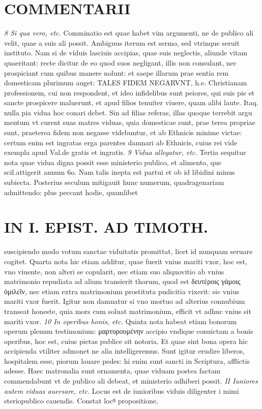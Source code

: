 \documentclass{article}
\begin{document}
\begin{pages}
\section*{COMMENTARII }
\marginpar{[ p.126 ]}
\textit{8 Si qua vero, etc. }\pstart Comminatio est quae habet vim argumenti, ne de publico ali velit, quae a suis ali possit. Ambiguus iterum est sermo, sed vtrinque seruit instituto. Nam si de viduis lasciuis accipias, quae suis neglectis, aliunde vitam quaeritant: recte dicitur de eo quod suos negligant, illis non consulant, nec prospiciant cum quibus  manere nolunt: et saepe illarum prae sentia rem domesticam plurimum auget: TALES FIDEM NEGARVNT, h.e. Christianam professionem, cui non respondent, et ideo infidelibus sunt peiores, qui suis pie et sancte prospicere maluerunt, et apud filios tenuiter viuere, quam alibi laute. Itaq. nulla pia vidua hoc conari debet. Sin ad filias referas, illas quoque terrebit argu mentum vt curent suas matres viduas, quia domesticae sunt, prae terea propriae sunt, praeterea fidem non negasse videbuntur, et ab Ethnicis minime victae: certum enim est ingratas erga parentes damnari ab Ethnicis, cuius rei vide exempla apud Val.de gratis et ingratis.  \pend
\textit{9 Vidua allegatur, etc. }\pstart Tertia sequitur nota quae vidua digna possit esse ministerio publico, et alimento, que scil.attigerit annum 6o. Nam talis inepta est partui et ob id libidini minus subiecta. Posterius seculum mitigauit hunc numerum, quadragenariam admittendo: plus peccant hodie, quamlibet  \pend
\section*{IN I. EPIST. AD TIMOTH. }
\marginpar{[ p.127 ]}\pstart suscipiendo modo votum sanctae viduitatis promittat, licet id nunquam seruare cogitet.  \pend\pstart Quarta nota hic etiam additur, quae fuerit vnius mariti vxor, hoc est, vno viuente, non alteri se copularit, nec etiam suo aliquovitio ab vnius matrimonio repudiata ad alium transierit thorum, quod est δευτέροις γάμοις ὁμιλεῖν, nec etiam extra matrimonium prostituta pudicitia vixerit: sic vnius mariti vxor fuerit. Igitur non damnatur si vno mortuo ad alterius connubium transeat honeste, quia mors cum soluat matrimonium, efficit vt adhuc vnius sit mariti vxor.  \pend
\textit{10 In operibus honis, etc. }\pstart Quinta nota habeat etiam bonorum operum plenum testimonium: μαρτυρουμένην accipio vndique conuictam a bonis operibus, hoc est, cuius pietas publice sit notoria. Et quae sint bona opera hic accipienda vtiliter admonet ne alia intelligeremus. Sunt igitur erudire liberos, hospitalem esse, piorum lauare pedes: hi enim sunt sancti in Scriptura, afflictis adesse. Haec matronalia sunt ornamenta, quae viduam postea factam commendabunt vt de publico ali debeat, et ministerio adhiberi possit.  \pend
\textit{II Iuniores autem viduas auersare, etc. }\pstart Locus est de iunioribus  viduis diligenter i mimi steriopublico cauendis. Constat locꝰ propositione,  \pend

\end{pages}
\end{document}
